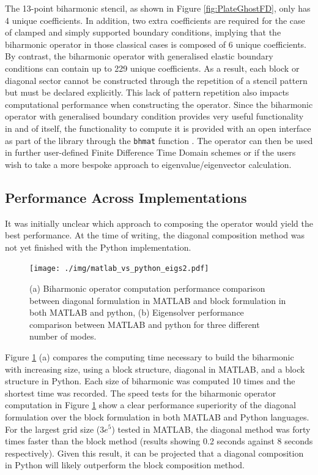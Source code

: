 The 13-point biharmonic stencil, as shown in Figure \ref{fig:PlateGhostFD}, only has 4 unique coefficients. In addition, two extra coefficients are required for the case of clamped and simply supported boundary conditions, implying that the biharmonic operator in those classical cases is composed of 6 unique coefficients. By contrast, the biharmonic operator with generalised elastic boundary conditions can contain up to 229 unique coefficients. As a result, each block or diagonal sector cannot be constructed through the repetition of a stencil pattern but must be declared explicitly. This lack of pattern repetition also impacts computational performance when constructing the operator. Since the biharmonic operator with generalised boundary condition provides very useful functionality in and of itself, the functionality to compute it is provided with an open interface as part of the library through the \texttt{bhmat} function \cite{MAGPIE_project_url}. The operator can then be used in further user-defined Finite Difference Time Domain schemes or if the users wish to take a more bespoke approach to eigenvalue/eigenvector calculation.


\subsection{Performance Across Implementations}
It was initially unclear which approach to composing the operator would yield the best performance. 
At the time of writing, the diagonal composition method was not yet finished with the Python implementation. 
\begin{figure}[H]
    \centering
    \texttt{[image: ./img/matlab\_vs\_python\_eigs2.pdf]}
    \caption{(a) Biharmonic operator computation performance comparison between diagonal formulation in MATLAB and block formulation in both MATLAB and python, (b) Eigensolver performance comparison between MATLAB and python for three different number of modes.}
    \label{fig:matlab_vs_python}
\end{figure}
Figure \ref{fig:matlab_vs_python} (a) compares the computing time necessary to build the biharmonic with increasing size, using a block structure, diagonal in MATLAB, and a block structure in Python. Each size of biharmonic was computed 10 times and the shortest time was recorded. The speed tests for the biharmonic operator computation in Figure \ref{fig:matlab_vs_python} show a clear performance superiority of the diagonal formulation over the block formulation in both MATLAB and Python languages. For the largest grid size ($3e^{5}$) tested in MATLAB, the diagonal method was forty times faster than the block method (results showing 0.2 seconds against 8 seconds respectively).
Given this result, it can be projected that a diagonal composition in Python will likely outperform the block composition method.

